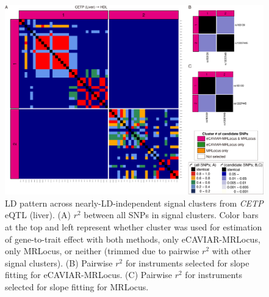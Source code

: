 \documentclass[11pt]{article}
\begin{document}
\begin{figure}[!ht]
  \centering
  \includegraphics[width=\textwidth]{figs/region/heatmap_eQTLbase.Liver_CETP_HDL.20210114.png}
  \caption{LD pattern across nearly-LD-independent signal clusters
    from \emph{CETP} eQTL (liver).
    (A) $r^2$ between all SNPs in signal clusters. Color bars at the
    top and left represent whether cluster was used for estimation of
    gene-to-trait effect with both methods, only eCAVIAR-MRLocus, only
    MRLocus, or neither (trimmed due to pairwise $r^2$ with other
    signal clusters). (B) Pairwise $r^2$ for instruments selected for
    slope fitting for eCAVIAR-MRLocus. (C) Pairwise $r^2$ for
    instruments selected for slope fitting for MRLocus.}
\end{figure}
\end{document}
